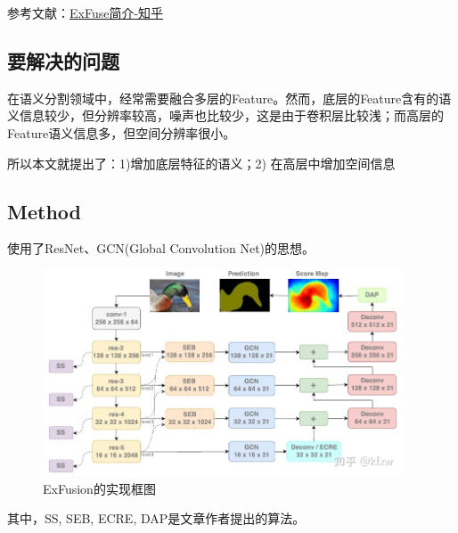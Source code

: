参考文献：\href{https://zhuanlan.zhihu.com/p/37177073}{ExFuse简介-知乎}

\subsection{要解决的问题}

在语义分割领域中，经常需要融合多层的Feature。然而，底层的Feature含有的语义信息较少，但分辨率较高，噪声也比较少，这是由于卷积层比较浅；而高层的Feature语义信息多，但空间分辨率很小。

所以本文就提出了：1)增加底层特征的语义；2) 在高层中增加空间信息

\subsection{Method}

使用了ResNet、GCN(Global Convolution Net)的思想。

\begin{figure}[!hbtp]
\centering
\includegraphics[width=0.95\textwidth]{SemanticSLAM/ExFusion0.jpg}
\caption{ExFusion的实现框图}
\label{ExFusion0}
\end{figure}

其中，SS, SEB, ECRE, DAP是文章作者提出的算法。

